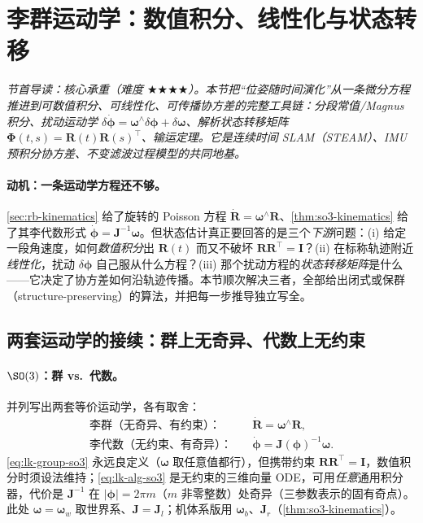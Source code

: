 \section{李群运动学：数值积分、线性化与状态转移}
\label{sec:lie-kinematics}
\noindent\emph{节首导读：核心承重（难度 $\bigstar\bigstar\bigstar\bigstar$）。本节把“位姿随时间演化”从\emph{一条微分方程}推进到\emph{可数值积分、可线性化、可传播协方差}的完整工具链：分段常值/Magnus 积分、扰动运动学 $\delta\dot{\boldsymbol{\phi}}=\boldsymbol{\omega}^\wedge\delta\boldsymbol{\phi}+\delta\boldsymbol{\omega}$、解析状态转移矩阵 $\boldsymbol{\Phi}(t,s)=\mathbf{R}(t)\mathbf{R}(s)^\top$、输运定理。它是连续时间 SLAM（STEAM）、IMU 预积分协方差、不变滤波过程模型的共同地基\cite{barfoot2024state}。}

\paragraph{动机：一条运动学方程还不够。}
\cref{sec:rb-kinematics} 给了旋转的 Poisson 方程 $\dot{\mathbf{R}}=\boldsymbol{\omega}^\wedge\mathbf{R}$、\cref{thm:so3-kinematics} 给了其李代数形式 $\dot{\boldsymbol{\phi}}=\mathbf{J}^{-1}\boldsymbol{\omega}$。但状态估计真正要回答的是三个\emph{下游}问题：(i) 给定一段角速度，如何\emph{数值积分}出 $\mathbf{R}(t)$ 而又不破坏 $\mathbf{R}\mathbf{R}^\top=\mathbf{I}$？(ii) 在标称轨迹附近\emph{线性化}，扰动 $\delta\boldsymbol{\phi}$ 自己服从什么方程？(iii) 那个扰动方程的\emph{状态转移矩阵}是什么——它决定了协方差如何沿轨迹传播。本节顺次解决三者，全部给出闭式或保群（structure-preserving）的算法，并把每一步推导独立写全。

\subsection{两套运动学的接续：群上无奇异、代数上无约束}
\label{subsec:lie-kin-two}

\paragraph{$\SO(3)$：群 vs.\ 代数。}并列写出两套等价运动学，各有取舍：
\begin{align}
  \text{李群（无奇异、有约束）：}&\quad \dot{\mathbf{R}}=\boldsymbol{\omega}^\wedge\mathbf{R}, \label{eq:lk-group-so3}\\
  \text{李代数（无约束、有奇异）：}&\quad \dot{\boldsymbol{\phi}}=\mathbf{J}(\boldsymbol{\phi})^{-1}\boldsymbol{\omega}. \label{eq:lk-alg-so3}
\end{align}
\cref{eq:lk-group-so3} 永远良定义（$\boldsymbol{\omega}$ 取任意值都行），但携带约束 $\mathbf{R}\mathbf{R}^\top=\mathbf{I}$，数值积分时须设法维持；\cref{eq:lk-alg-so3} 是无约束的三维向量 ODE，可用\emph{任意}通用积分器，代价是 $\mathbf{J}^{-1}$ 在 $|\boldsymbol{\phi}|=2\pi m$（$m$ 非零整数）处奇异（三参数表示的固有奇点）。此处 $\boldsymbol{\omega}=\boldsymbol{\omega}_w$ 取世界系、$\mathbf{J}=\mathbf{J}_l$；机体系版用 $\boldsymbol{\omega}_b$、$\mathbf{J}_r$（\cref{thm:so3-kinematics}）。

